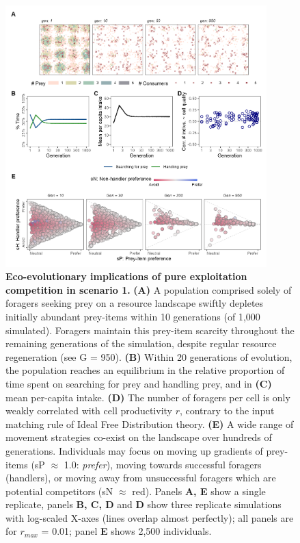 \begin{refsection}[sorting=nyt]
\begin{figure}[t!]
    \centering
    \includegraphics[width=0.9\textwidth]{figures/kleptomove/fig_01.png}
    \caption{
        \textbf{Eco-evolutionary implications of pure exploitation competition in scenario 1.}
        \textbf{(A)} A population comprised solely of foragers seeking prey on a resource landscape swiftly depletes initially abundant prey-items within 10 generations (of 1,000 simulated).
        Foragers maintain this prey-item scarcity throughout the remaining generations of the simulation, despite regular resource regeneration (see G = 950).
        \textbf{(B)} Within 20 generations of evolution, the population reaches an equilibrium in the relative proportion of time spent on searching for prey and handling prey, and in \textbf{(C)} mean per-capita intake.
        \textbf{(D)} The number of foragers per cell is only weakly correlated with cell productivity $r$, contrary to the input matching rule of Ideal Free Distribution theory.
        \textbf{(E)} A wide range of movement strategies co-exist on the landscape over hundreds of generations.
        Individuals may focus on moving up gradients of prey-items (sP $\approx$ 1.0: \textit{prefer}), moving towards successful foragers (handlers), or moving away from unsuccessful foragers which are potential competitors (sN $\approx$ red).
        Panels \textbf{A, E} show a single replicate, panels \textbf{B, C, D} and \textbf{D} show three replicate simulations with log-scaled X-axes (lines overlap almost perfectly); all panels are for $r_{max}$ = 0.01; panel \textbf{E} shows 2,500 individuals.
    }
    \label{fig1}
\end{figure}


\end{refsection}
